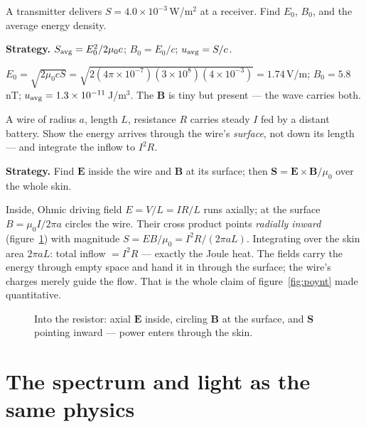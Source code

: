 \begin{example}\label{ex:waveS}
A transmitter delivers $S=4.0\times10^{-3}$\,W/m$^{2}$ at a receiver.
Find $E_0$, $B_0$, and the average energy density.
\par\smallskip
\textbf{Strategy.} $S_{\rm avg}=E_0^{2}/2\mu_0c$; $B_0=E_0/c$;
$u_{\rm avg}=S/c$.
\begin{solution}
$E_0=\sqrt{2\mu_0cS}=\sqrt{2(4\pi\times10^{-7})(3\times10^{8})(4\times10^{-3})}
=1.74$\,V/m; $B_0=5.8$\,nT;
$u_{\rm avg}=1.3\times10^{-11}$\,J/m$^{3}$. The $\mathbf B$ is tiny
but present --- the wave carries both. \checkmark
\end{solution}
\end{example}

\begin{example}\label{ex:poyntres}
A wire of radius $a$, length $L$, resistance $R$ carries steady
$I$ fed by a distant battery. Show the energy arrives through the
wire's \emph{surface}, not down its length --- and integrate the
inflow to $I^{2}R$.
\par\smallskip
\textbf{Strategy.} Find $\mathbf E$ inside the wire and $\mathbf B$
at its surface; then $\mathbf S=\mathbf E\times\mathbf B/\mu_0$ over
the whole skin.
\begin{solution}
Inside, Ohmic driving field $E=V/L=IR/L$ runs axially; at the surface
$B=\mu_0I/2\pi a$ circles the wire. Their cross product points
\emph{radially inward}
(figure~\ref{fig:poyntin}) with magnitude
$S=EB/\mu_0=I^{2}R/(2\pi aL)$. Integrating over the skin area
$2\pi aL$: total inflow $=I^{2}R$ --- exactly the Joule heat. The
fields carry the energy through empty space and hand it in through
the surface; the wire's charges merely guide the flow. That is the
whole claim of figure~\ref{fig:poynt} made quantitative.
\checkmark
\end{solution}
\end{example}

\begin{figure}[htbp]\centering

\caption{Into the resistor: axial $\mathbf E$ inside, circling
$\mathbf B$ at the surface, and $\mathbf S$ pointing inward --- power
enters through the skin.}
\label{fig:poyntin}
\end{figure}

\section{The spectrum and light as the same physics}\label{sec:max-spectrum}

